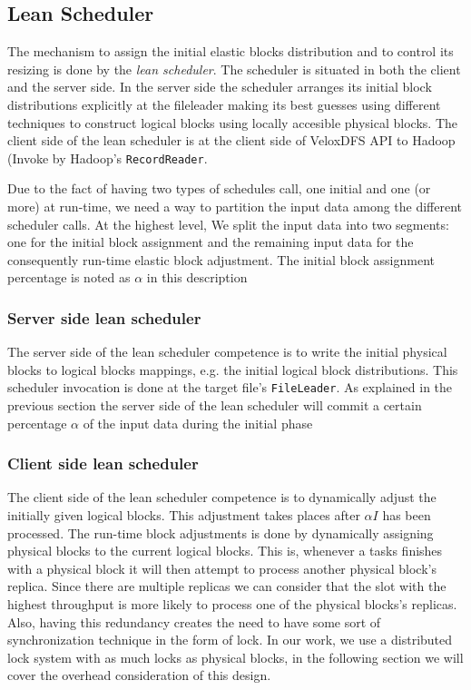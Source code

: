\subsection{Lean Scheduler}
The mechanism to assign the initial elastic blocks distribution and to control its resizing is done by the \textit{lean scheduler}. The scheduler is situated in both the client and the server side. In the server side the scheduler arranges its initial block distributions explicitly at the fileleader making its best guesses using different techniques to construct logical blocks using locally accesible physical blocks. The client side of the lean scheduler is at the client side of VeloxDFS API to Hadoop (Invoke by Hadoop's \texttt{RecordReader}.

Due to the fact of having two types of schedules call, one initial and one (or more) at run-time, we need a way to partition the input data 
among the different scheduler calls. At the highest level, We split the input data into two segments: one for the initial block assignment and the remaining input data for the consequently run-time elastic block adjustment. The initial block assignment percentage is noted as $\alpha$ in this description

\subsubsection{Server side lean scheduler}
The server side of the lean scheduler competence is to write the initial physical blocks to logical blocks mappings, e.g. the initial logical block distributions. This scheduler invocation is done at the target file's \texttt{FileLeader}. As explained in the previous section the server side of the lean scheduler will commit a certain percentage $\alpha$ of the input data during the initial phase 

\subsubsection{Client side lean scheduler}
The client side of the lean scheduler competence is to dynamically adjust the initially given logical blocks. This adjustment takes places after $\alpha I$ has been processed. The run-time block adjustments is done by dynamically assigning physical blocks to the current logical blocks. This is, whenever a tasks finishes with a physical block it will then attempt to process another physical block's replica. Since there are multiple replicas we can consider that the slot with the highest throughput is more likely to process one of the physical blocks's replicas. Also, having this redundancy creates the need to have some sort of synchronization technique in the form of lock. In our work, we use a distributed lock system with as much locks as physical blocks, in the following section we will cover the overhead consideration of this design.


